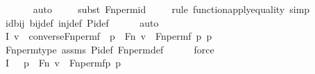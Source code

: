 \begin{isabellebody}
\ \ \ \ \ \isamarkupfalse%
\ auto{\isacharbrackleft}{\kern0pt}{}{\isacharbrackright}{\kern0pt}\isanewline
\ \ \ \ \isamarkupfalse%
{\isacharparenleft}{\kern0pt}subst\ Fn{\isacharunderscore}{\kern0pt}perm{\isacharprime}{\kern0pt}{\isacharunderscore}{\kern0pt}id{\isacharparenright}{\kern0pt}\isanewline
\ \ \ \ \isamarkupfalse%
{\isacharparenleft}{\kern0pt}rule\ function{\isacharunderscore}{\kern0pt}apply{\isacharunderscore}{\kern0pt}equality{\isacharcomma}{\kern0pt}\ simp{\isacharparenright}{\kern0pt}\isanewline
\ \ \ \ \isamarkupfalse%
\ id{\isacharunderscore}{\kern0pt}bij\ bij{\isacharunderscore}{\kern0pt}def\ inj{\isacharunderscore}{\kern0pt}def\ Pi{\isacharunderscore}{\kern0pt}def\isanewline
\ \ \ \ \isamarkupfalse%
\ auto\isanewline
\isanewline
\ \ \isamarkupfalse%
\ I{}{\isacharcolon}{\kern0pt}\ {\isachardoublequoteopen}v\ {\isasymin}\ converse{\isacharparenleft}{\kern0pt}Fn{\isacharunderscore}{\kern0pt}perm{\isacharprime}{\kern0pt}{\isacharparenleft}{\kern0pt}f{\isacharparenright}{\kern0pt}{\isacharparenright}{\kern0pt}\ {\isasymlongleftrightarrow}\ {\isacharparenleft}{\kern0pt}{\isasymexists}p\ {\isasymin}\ Fn{\isachardot}{\kern0pt}\ v\ {\isacharequal}{\kern0pt}\ {\isacharless}{\kern0pt}Fn{\isacharunderscore}{\kern0pt}perm{\isacharparenleft}{\kern0pt}f{\isacharcomma}{\kern0pt}\ p{\isacharparenright}{\kern0pt}{\isacharcomma}{\kern0pt}\ p{\isachargreater}{\kern0pt}{\isacharparenright}{\kern0pt}{\isachardoublequoteclose}\isanewline
\ \ \ \ \isamarkupfalse%
\ Fn{\isacharunderscore}{\kern0pt}perm{\isacharprime}{\kern0pt}{\isacharunderscore}{\kern0pt}type\ assms\ Pi{\isacharunderscore}{\kern0pt}def\ Fn{\isacharunderscore}{\kern0pt}perm{\isacharprime}{\kern0pt}{\isacharunderscore}{\kern0pt}def\isanewline
\ \ \ \ \isamarkupfalse%
\ force\isanewline
\ \ \isamarkupfalse%
\ I{}{\isacharcolon}{\kern0pt}\ {\isachardoublequoteopen}{\isachardot}{\kern0pt}{\isachardot}{\kern0pt}{\isachardot}{\kern0pt}\ {\isasymlongleftrightarrow}\ {\isacharparenleft}{\kern0pt}{\isasymexists}p\ {\isasymin}\ Fn{\isachardot}{\kern0pt}\ v\ {\isacharequal}{\kern0pt}\ {\isacharless}{\kern0pt}Fn{\isacharunderscore}{\kern0pt}perm{\isacharprime}{\kern0pt}{\isacharparenleft}{\kern0pt}f{\isacharparenright}{\kern0pt}{\isacharbackquote}{\kern0pt}p{\isacharcomma}{\kern0pt}\ p{\isachargreater}{\kern0pt}{\isacharparenright}{\kern0pt}{\isachardoublequoteclose}\isanewline
\ \ \ \ \isamarkupfalse%

\end{isabellebody}
